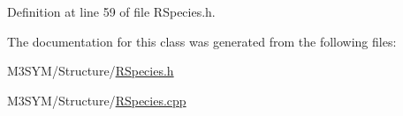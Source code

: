 Definition at line 59 of file R\+Species.\+h.



The documentation for this class was generated from the following files\+:\begin{DoxyCompactItemize}
\item 
M3\+S\+Y\+M/\+Structure/\hyperlink{RSpecies_8h}{R\+Species.\+h}\item 
M3\+S\+Y\+M/\+Structure/\hyperlink{RSpecies_8cpp}{R\+Species.\+cpp}\end{DoxyCompactItemize}
